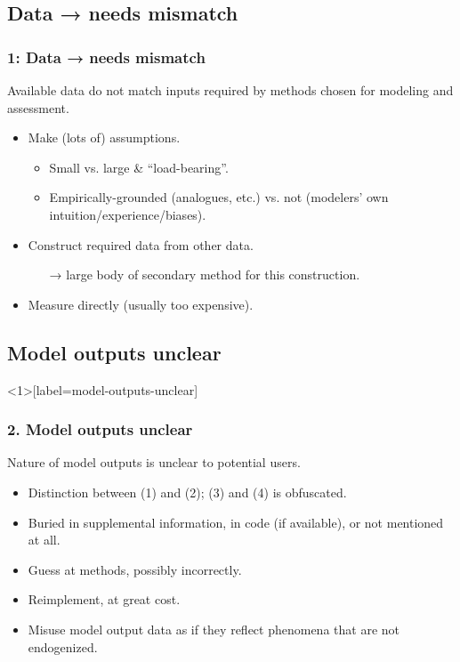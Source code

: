 \documentclass[14pt,aspectratio=169]{beamer}
\begin{document}
\subsection{Data → needs mismatch}

\begin{frame}
\frametitle{1: Data → needs mismatch}

Available data do not match inputs required by methods chosen for modeling and assessment.

\bigskip
{}
\pause
\begin{itemize}
  \item Make (lots of) assumptions.
    \begin{itemize}
      \item Small vs. large \& “load-bearing”.
      \item Empirically-grounded (analogues, etc.) vs. not (modelers' own intuition/experience/biases).
    \end{itemize}
  \item Construct required data from other data.
    \begin{itemize}
      \item [→] large body of secondary method for this construction.
    \end{itemize}
  \item Measure directly (usually too expensive).
\end{itemize}

\end{frame}

\subsection{Model outputs unclear}

\begin{frame}<1>[label=model-outputs-unclear]
\frametitle{2. Model outputs unclear}

Nature of model outputs is unclear to potential users.
\pause
\begin{itemize}
  \item Distinction between (1) and (2); (3) and (4) is obfuscated.
  \item Buried in supplemental information, in code (if available), or not mentioned at all.
\end{itemize}

\bigskip
\pause
{}
\begin{itemize}
  \item Guess at methods, possibly incorrectly.
  \item Reimplement, at great cost.
  \item Misuse model output data as if they reflect phenomena that are not endogenized.
\end{itemize}

\end{frame}
\end{document}
